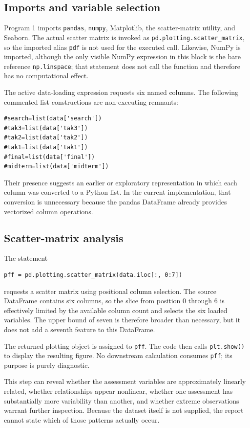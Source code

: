 \documentclass[11pt,a4paper]{article}
\begin{document}
\subsection{Imports and variable selection}
Program 1 imports \texttt{pandas}, \texttt{numpy}, Matplotlib, the scatter-matrix utility, and Seaborn. The actual scatter matrix is invoked as \texttt{pd.plotting.scatter\_matrix}, so the imported alias \texttt{pdf} is not used for the executed call. Likewise, NumPy is imported, although the only visible NumPy expression in this block is the bare reference \texttt{np.linspace}; that statement does not call the function and therefore has no computational effect.

The active data-loading expression requests six named columns. The following commented list constructions are non-executing remnants:
\begin{lstlisting}
#search=list(data['search'])
#tak3=list(data['tak3'])
#tak2=list(data['tak2'])
#tak1=list(data['tak1'])
#final=list(data['final'])
#midterm=list(data['midterm'])
\end{lstlisting}
Their presence suggests an earlier or exploratory representation in which each column was converted to a Python list. In the current implementation, that conversion is unnecessary because the pandas DataFrame already provides vectorized column operations.

\subsection{Scatter-matrix analysis}
The statement
\begin{lstlisting}
pff = pd.plotting.scatter_matrix(data.iloc[:, 0:7])
\end{lstlisting}
requests a scatter matrix using positional column selection. The source DataFrame contains six columns, so the slice from position $0$ through $6$ is effectively limited by the available column count and selects the six loaded variables. The upper bound of seven is therefore broader than necessary, but it does not add a seventh feature to this DataFrame.

The returned plotting object is assigned to \texttt{pff}. The code then calls \texttt{plt.show()} to display the resulting figure. No downstream calculation consumes \texttt{pff}; its purpose is purely diagnostic.

This step can reveal whether the assessment variables are approximately linearly related, whether relationships appear nonlinear, whether one assessment has substantially more variability than another, and whether extreme observations warrant further inspection. Because the dataset itself is not supplied, the report cannot state which of those patterns actually occur.
\end{document}
